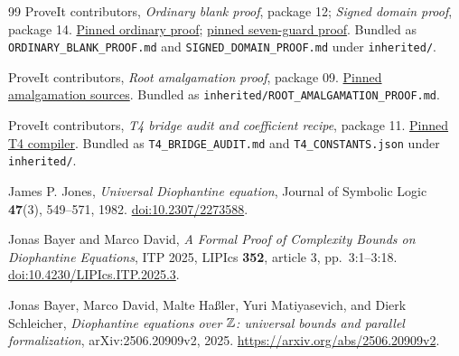 \begin{thebibliography}{99}
ProveIt contributors, \emph{Ordinary blank proof}, package 12;
\emph{Signed domain proof}, package 14.
\href{https://github.com/VladimirReshetnikov/ProveIt/tree/f0ae4e0991ca44a7bb4e5671d42e33d775e48035/SetTheory/Cardinals/docs/reports/hilbert-tenth-problem/con-zfc-diophantine-forms/12-gap-norm14/proofs}{Pinned ordinary proof};
\href{https://github.com/VladimirReshetnikov/ProveIt/tree/f0ae4e0991ca44a7bb4e5671d42e33d775e48035/SetTheory/Cardinals/docs/reports/hilbert-tenth-problem/con-zfc-diophantine-forms/14-integer29/proofs}{pinned seven-guard proof}.
Bundled as \texttt{ORDINARY\_BLANK\_PROOF.md} and
\texttt{SIGNED\_DOMAIN\_PROOF.md} under \texttt{inherited/}.

ProveIt contributors, \emph{Root amalgamation proof}, package 09.
\href{https://github.com/VladimirReshetnikov/ProveIt/tree/f0ae4e0991ca44a7bb4e5671d42e33d775e48035/SetTheory/Cardinals/docs/reports/hilbert-tenth-problem/con-zfc-diophantine-forms/09-combined13/proofs}{Pinned amalgamation sources}.
Bundled as \texttt{inherited/ROOT\_AMALGAMATION\_PROOF.md}.

ProveIt contributors, \emph{T4 bridge audit and coefficient recipe},
package 11.
\href{https://github.com/VladimirReshetnikov/ProveIt/tree/f0ae4e0991ca44a7bb4e5671d42e33d775e48035/SetTheory/Cardinals/docs/reports/hilbert-tenth-problem/con-zfc-diophantine-forms/11-t4/bridge}{Pinned T4 compiler}.
Bundled as \texttt{T4\_BRIDGE\_AUDIT.md} and
\texttt{T4\_CONSTANTS.json} under \texttt{inherited/}.

James P. Jones, \emph{Universal Diophantine equation},
Journal of Symbolic Logic \textbf{47}(3), 549--571, 1982.
\href{https://doi.org/10.2307/2273588}{doi:10.2307/2273588}.

Jonas Bayer and Marco David,
\emph{A Formal Proof of Complexity Bounds on Diophantine Equations},
ITP 2025, LIPIcs \textbf{352}, article 3, pp.~3:1--3:18.
\href{https://doi.org/10.4230/LIPIcs.ITP.2025.3}{doi:10.4230/LIPIcs.ITP.2025.3}.

Jonas Bayer, Marco David, Malte Ha\ss ler, Yuri Matiyasevich,
and Dierk Schleicher,
\emph{Diophantine equations over $\mathbb Z$: universal bounds and parallel
formalization}, arXiv:2506.20909v2, 2025.
\url{https://arxiv.org/abs/2506.20909v2}.

\end{thebibliography}
